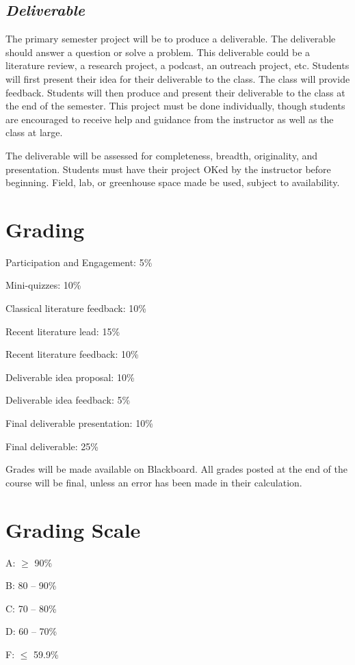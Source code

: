 \documentclass[12pt, notitlepage]{article}   	%
\begin{document}
\subsection{\textit{Deliverable}}
The primary semester project will be to produce a deliverable. 
The deliverable should answer a question or solve a problem.
This deliverable could be a literature review, a research project, a podcast, 
an outreach project, etc. Students will first present their idea for their deliverable 
to the class. The class will provide feedback. Students will then produce and present 
their deliverable to the class at the end of the semester. This project must be done
individually, though students are encouraged to receive help and guidance from the
instructor as well as the class at large.

The deliverable will be assessed for completeness, breadth, originality, and presentation.
Students must have their project OKed by the instructor before beginning. Field, lab,
or greenhouse space made be used, subject to availability.

\section{Grading}
Participation and Engagement: 5\% \par
Mini-quizzes: 10\% \par
Classical literature feedback: 10\% \par
Recent literature lead: 15\% \par
Recent literature feedback: 10\% \par
Deliverable idea proposal: 10\% \par
Deliverable idea feedback: 5\% \par
Final deliverable presentation: 10\% \par
Final deliverable: 25\% \par

Grades will be made available on Blackboard. 
All grades posted at the end of the course will be final, 
unless an error has been made in their calculation.

\section{Grading Scale}
A: $\geq$ 90\% \par
B: 80 – 90\% \par
C: 70 – 80\% \par
D: 60 – 70\% \par
F: $\leq$ 59.9\% \par
\end{document}
